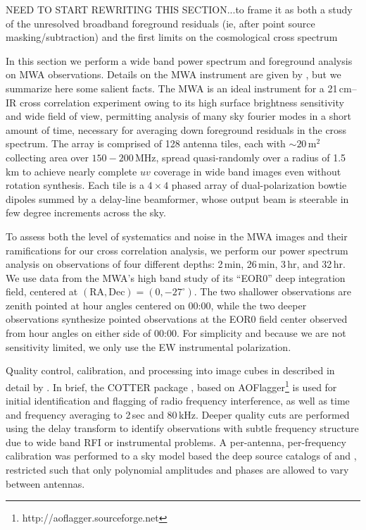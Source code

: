 \documentclass{emulateapj}
\begin{document}
NEED TO START REWRITING THIS SECTION...to frame it as both a study of the unresolved broadband foreground residuals (ie, after point source masking/subtraction) and the first limits on the cosmological cross spectrum

In this section we perform a wide band power spectrum and foreground analysis on MWA observations. Details on the MWA instrument are given by \citet{tingay13}, but we summarize here some salient facts. The MWA is an ideal instrument for a 21\,cm--IR cross correlation experiment owing to its high surface brightness sensitivity and wide field of view, permitting analysis of many sky fourier modes in a short amount of time, necessary for averaging down foreground residuals in the cross spectrum. The array is comprised of 128 antenna tiles, each with $\sim20\,\text{m}^2$ collecting area over $150-200\,$MHz, spread quasi-randomly over a radius of 1.5\,km to achieve nearly complete $uv$ coverage in wide band images even without rotation synthesis. Each tile is a $4\times4$ phased array of dual-polarization bowtie dipoles summed by a delay-line beamformer, whose output beam is steerable in few degree increments across the sky. 

To assess both the level of systematics and noise in the MWA images and their ramifications for our cross correlation analysis, we perform our power spectrum analysis on observations of four different depths: 2\,min, 26\,min, 3\,hr, and 32\,hr. We use data from the MWA's high band study of its ``EOR0'' deep integration field, centered at $(\text{RA}, \text{Dec})=(0,-27^\circ)$. The two shallower observations are zenith pointed at hour angles centered on 00:00, while the two deeper observations synthesize pointed observations at the EOR0 field center observed from hour angles on either side of 00:00. For simplicity and because we are not sensitivity limited, we only use the EW instrumental polarization.

Quality control, calibration, and processing into image cubes in described in detail by \citet{beardsley16}. In brief, the COTTER package \citep{AndreMWARFI}, based on AOFlagger\footnote{http://aoflagger.sourceforge.net} \citep{aoflagger} is used for initial identification and flagging of radio frequency interference, as well as time and frequency averaging to 2\,sec and 80\,kHz. Deeper quality cuts are performed using the delay transform \citep{parsons12b} to identify observations with subtle frequency structure due to wide band RFI or instrumental problems. A per-antenna, per-frequency calibration was performed to a sky model based the deep source catalogs of \citet{PattiCatalog1} and \citet{mwacs}, restricted such that only polynomial amplitudes and phases are allowed to vary between antennas. 
\end{document}
